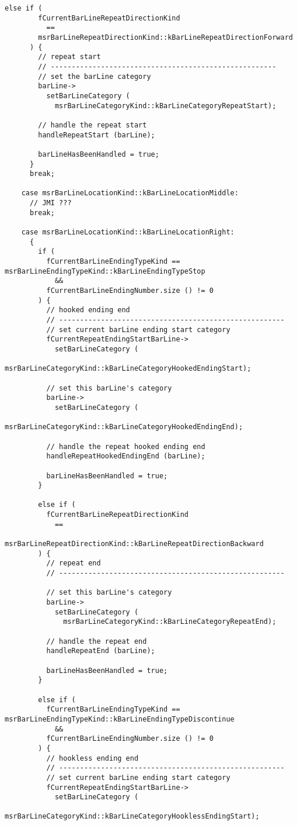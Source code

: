 \begin{lstlisting}[language=CPlusPlus]
      else if (
        fCurrentBarLineRepeatDirectionKind
          ==
        msrBarLineRepeatDirectionKind::kBarLineRepeatDirectionForward
      ) {
        // repeat start
        // ------------------------------------------------------
        // set the barLine category
        barLine->
          setBarLineCategory (
            msrBarLineCategoryKind::kBarLineCategoryRepeatStart);

        // handle the repeat start
        handleRepeatStart (barLine);

        barLineHasBeenHandled = true;
      }
      break;

    case msrBarLineLocationKind::kBarLineLocationMiddle:
      // JMI ???
      break;

    case msrBarLineLocationKind::kBarLineLocationRight:
      {
        if (
          fCurrentBarLineEndingTypeKind == msrBarLineEndingTypeKind::kBarLineEndingTypeStop
            &&
          fCurrentBarLineEndingNumber.size () != 0
        ) {
          // hooked ending end
          // ------------------------------------------------------
          // set current barLine ending start category
          fCurrentRepeatEndingStartBarLine->
            setBarLineCategory (
              msrBarLineCategoryKind::kBarLineCategoryHookedEndingStart);

          // set this barLine's category
          barLine->
            setBarLineCategory (
              msrBarLineCategoryKind::kBarLineCategoryHookedEndingEnd);

          // handle the repeat hooked ending end
          handleRepeatHookedEndingEnd (barLine);

          barLineHasBeenHandled = true;
        }

        else if (
          fCurrentBarLineRepeatDirectionKind
            ==
          msrBarLineRepeatDirectionKind::kBarLineRepeatDirectionBackward
        ) {
          // repeat end
          // ------------------------------------------------------

          // set this barLine's category
          barLine->
            setBarLineCategory (
              msrBarLineCategoryKind::kBarLineCategoryRepeatEnd);

          // handle the repeat end
          handleRepeatEnd (barLine);

          barLineHasBeenHandled = true;
        }

        else if (
          fCurrentBarLineEndingTypeKind == msrBarLineEndingTypeKind::kBarLineEndingTypeDiscontinue
            &&
          fCurrentBarLineEndingNumber.size () != 0
        ) {
          // hookless ending end
          // ------------------------------------------------------
          // set current barLine ending start category
          fCurrentRepeatEndingStartBarLine->
            setBarLineCategory (
              msrBarLineCategoryKind::kBarLineCategoryHooklessEndingStart);


\end{lstlisting}
